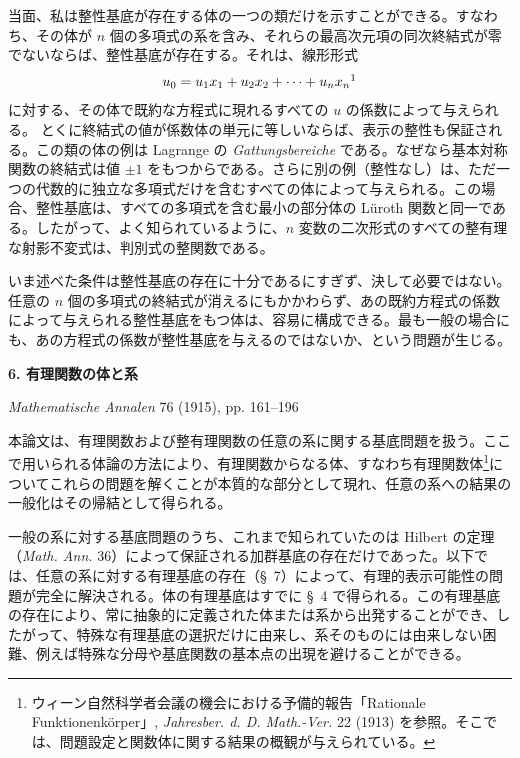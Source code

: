 \documentclass[11pt]{article}
\begin{document}
当面、私は整性基底が存在する体の一つの類だけを示すことができる。すなわち、その体が $n$ 個の多項式の系を含み、それらの最高次元項の同次終結式が零でないならば、整性基底が存在する。それは、線形形式
\[
  u_0=u_1x_1+u_2x_2+\cdots+u_nx_n\footnotemark
\]
に対する、その体で既約な方程式に現れるすべての $u$ の係数によって与えられる。
とくに終結式の値が係数体の単元に等しいならば、表示の整性も保証される。この類の体の例は Lagrange の \emph{Gattungsbereiche} である。なぜなら基本対称関数の終結式は値 $\pm 1$ をもつからである。さらに別の例（整性なし）は、ただ一つの代数的に独立な多項式だけを含むすべての体によって与えられる。この場合、整性基底は、すべての多項式を含む最小の部分体の Lüroth 関数と同一である。したがって、よく知られているように、$n$ 変数の二次形式のすべての整有理な射影不変式は、判別式の整関数である。

いま述べた条件は整性基底の存在に十分であるにすぎず、決して必要ではない。任意の $n$ 個の多項式の終結式が消えるにもかかわらず、あの既約方程式の係数によって与えられる整性基底をもつ体は、容易に構成できる。最も一般の場合にも、あの方程式の係数が整性基底を与えるのではないか、という問題が生じる。

\clearpage

\begin{center}
{\Large\bfseries 6. 有理関数の体と系}\par
\vspace{1.2em}
\emph{Mathematische Annalen} 76 (1915), pp. 161--196
\end{center}

\vspace{1.5em}

本論文は、有理関数および整有理関数の任意の系に関する基底問題を扱う。ここで用いられる体論の方法により、有理関数からなる体、すなわち有理関数体\footnote{ウィーン自然科学者会議の機会における予備的報告「Rationale Funktionenkörper」, \emph{Jahresber. d. D. Math.-Ver.} 22 (1913) を参照。そこでは、問題設定と関数体に関する結果の概観が与えられている。}についてこれらの問題を解くことが本質的な部分として現れ、任意の系への結果の一般化はその帰結として得られる。

一般の系に対する基底問題のうち、これまで知られていたのは Hilbert の定理（\emph{Math. Ann.} 36）によって保証される加群基底の存在だけであった。以下では、任意の系に対する有理基底の存在（\S\ 7）によって、有理的表示可能性の問題が完全に解決される。体の有理基底はすでに \S\ 4 で得られる。この有理基底の存在により、常に抽象的に定義された体または系から出発することができ、したがって、特殊な有理基底の選択だけに由来し、系そのものには由来しない困難、例えば特殊な分母や基底関数の基本点の出現を避けることができる。
\end{document}
